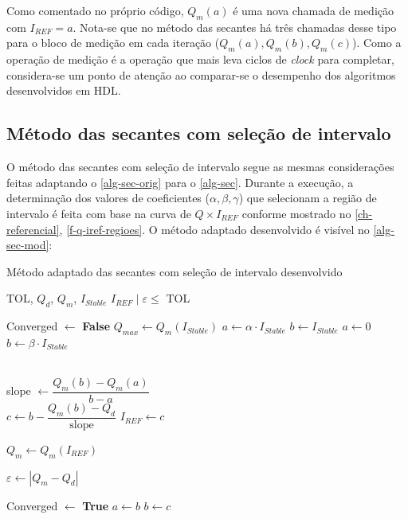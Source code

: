 Como comentado no próprio código, $Q_m(a)$ é uma nova chamada de medição com $I_{REF} = a$. Nota-se que no método das secantes há três chamadas desse tipo para o bloco de medição em cada iteração ($Q_m(a), Q_m(b), Q_m(c)$). Como a operação de medição é a operação que mais leva ciclos de \textit{clock} para completar, considera-se um ponto de atenção ao comparar-se o desempenho dos algoritmos desenvolvidos em HDL.


\subsection{Método das secantes com seleção de intervalo}\label{ss-adapt-modsec}

O método das secantes com seleção de intervalo segue as mesmas considerações feitas adaptando o \autoref{alg-sec-orig} para o \autoref{alg-sec}. Durante a execução, a determinação dos valores de coeficientes ($\alpha, \beta, \gamma$) que selecionam a região de intervalo é feita com base na curva de $Q \times I_{REF}$ conforme mostrado no \autoref{ch-referencial}, \autoref{f-q-iref-regioes}. O método adaptado desenvolvido é visível no \autoref{alg-sec-mod}:

\begin{algorithm}[H]
\caption{Método adaptado das secantes com seleção de intervalo desenvolvido}\label{alg-sec-mod}
\begin{algorithmic}[1]

\Require TOL, $Q_{d}$, $Q_{m}$, $I_{Stable}$
\Ensure $I_{REF} \; | \; \varepsilon \leq$ TOL

\State Converged $\gets$ \textbf{False}
\State $Q_{max} \gets Q_m(I_{Stable})$
 
    \State $a \gets \alpha \cdot I_{Stable}$
    \State $b \gets I_{Stable}$
    \Else {}
        \State $a \gets 0$
        \State $b \gets \beta \cdot I_{Stable}$
\EndIf


  \\
    \State slope $ \gets \dfrac{Q_m(b) - Q_m(a)}{b-a}$
     \\
    \State $c \gets b - \dfrac{Q_m(b) - Q_d}{\text{slope}}$
    \State $I_{REF} \gets c$

    \State $Q_{m} \gets Q_{m}\left(I_{REF}\right)$  

    \State $\varepsilon \gets \left|Q_m - Q_d \right|$

     Converged $\gets$ \textbf{True} 
        \Else
            \State $a \gets b$
            \State $b \gets c$
    \EndIf

\EndWhile
\end{algorithmic}
\end{algorithm}

